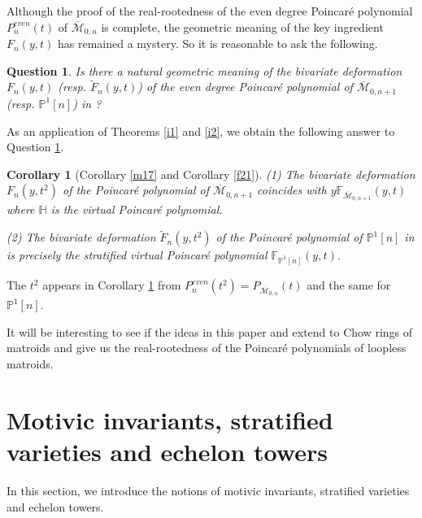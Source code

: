 \documentclass[11pt]{amsart}
\newtheorem{corollary}[theorem]{Corollary}
\newtheorem{question}[theorem]{Question}
\newcommand{\Mbarzn}{\overline{\mathcal M}_{0,n}}
\newcommand{\PP}{\mathbb{P}}
\newcommand{\cM}{\mathcal{M}}
\newcommand{\bcM}{\overline{\cM}}
\def\cM{\mathcal{M}}
\def\HH{\mathbb{H}}
\def\FF{\mathbb{F}}
\begin{document}
Although the proof of the real-rootedness of the even degree Poincar\'e polynomial $P^{even}_{n}(t)$ of $\Mbarzn$ is complete, the geometric meaning of the key ingredient $F_n(y,t)$ has remained a mystery. So it is reasonable to ask the following. 
\begin{question}\label{i4}
    Is there a natural geometric meaning of the bivariate deformation $F_n(y,t)$ (resp. $\widetilde{F}_n(y,t)$) of the even degree Poincar\'e polynomial of $\bcM_{0,n+1}$ (resp. $\PP^1[n]$) in \cite{BercziKiem2026}?
\end{question} 

As an application of Theorems \ref{i1} and \ref{i2}, we obtain the following answer to Question \ref{i4}.
\begin{corollary} [Corollary \ref{m17} and Corollary \ref{f21}]\label{i6}
    (1) The bivariate deformation $F_n(y,t^2)$ of the Poincar\'e polynomial of $\bcM_{0,n+1}$ coincides with $y\FF_{\bcM_{0,n+1}}(y,t)$ where 
    $\HH$ is the virtual Poincar\'e polynomial. 

    (2) The bivariate deformation $\widetilde{F}_n(y,t^2)$ of the Poincar\'e polynomial of $\PP^1[n]$ in \cite{BercziKiem2026} is precisely the stratified virtual Poincar\'e polynomial $\FF_{\PP^1[n]}(y,t)$.  
\end{corollary} 
The $t^2$ appears in Corollary \ref{i6} from 
$P^{even}_{n}(t^2)=P_{\Mbarzn}(t)$ and the same for $\PP^1[n]$.

\medskip

It will be interesting to see if the ideas in this paper and \cite{BercziKiem2026} extend to Chow rings of matroids and give us the real-rootedness of the Poincar\'e polynomials of loopless matroids. 




\bigskip

\section{Motivic invariants, stratified varieties and echelon towers}
In this section, we introduce the notions of motivic invariants, stratified varieties and echelon towers. 
\end{document}
